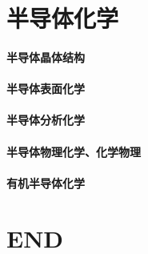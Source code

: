 \documentclass[UTF8]{../03-Chemistry}
\begin{document}
\chapter{半导体化学}
    \subsubsection{半导体晶体结构}
    \subsubsection{半导体表面化学}
    \subsubsection{半导体分析化学}
    \subsubsection{半导体物理化学、化学物理}
    \subsubsection{有机半导体化学}


\chapter{END}
\end{document}

